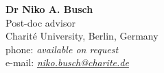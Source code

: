 \documentclass[margin,line]{resume}
\begin{document}
\begin{resume}
	\textbf{Dr Niko A. Busch} \\
	Post-doc advisor\\
	Charité University, Berlin, Germany \\
	phone: \textsl{available on request} \\
	e-mail: \textsl{\href{mailto:niko.busch@charite.de}{niko.busch@charite.de}} \\

\end{resume}
\end{document}
